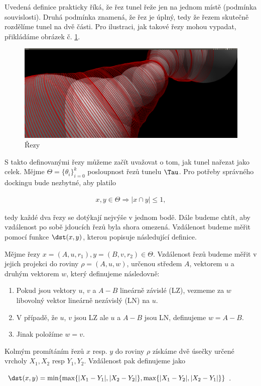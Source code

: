 Uvedená definice prakticky říká, že řez tunel řeže jen na jednom místě (podmínka souvislosti).
Druhá podmínka znamená, že řez je úplný, tedy že řezem skutečně rozdělíme tunel na dvě části.
Pro ilustraci, jak takové řezy mohou vypadat, přikládáme obrázek č. \ref{fig:tunnel_cuts}.
\begin{figure}[ht]
    \centering
    \includegraphics[width=\textwidth]{img/simple_cuts.png}
    \caption{Řezy}
  \centering
  \label{fig:tunnel_cuts}
\end{figure}

S takto definovanými řezy můžeme začít uvažovat o tom, jak tunel nařezat jako celek.
Mějme $ \Theta = \{\theta_i\}_{i=0}^{k}$ posloupnost řezů tunelu $ \Tau $. Pro potřeby správného
dockingu bude nezbytné, aby platilo

\begin{align}
x, y \in \Theta \Rightarrow |x \cap y| \leq 1, \label{cond:not_intersecting}
\end{align}

tedy každé dva řezy se dotýkají nejvýše v jednom bodě. Dále budeme chtít, aby vzdálenost
po sobě jdoucích řezů byla shora omezená. Vzdálenost budeme měřit pomocí funkce
$ \dst(x, y) $, kterou popisuje následující definice.

\begin{defi}
Mějme řezy $ x = (A, u, r_1), y = (B, v, r_2) \in \Theta $. Vzdálenost řezů budeme
měřit v jejich projekci do roviny $ \rho = (A, u, w) $, určenou středem $ A $,
vektorem $ u $ a druhým vektorem $ w $, který definujeme následovně:
    \begin{enumerate}[label={(\arabic*)}]
        \item Pokud jsou vektory $ u $, $ v $ a $ A - B $ lineárně závislé (LZ), vezmeme
            za $ w $ libovolný vektor lineárně nezávislý (LN) na $ u $.
        \item V případě, že $ u $, $ v $ jsou LZ ale $ u $ a $ A - B $ jsou LN,
            definujeme $ w = A - B $.
        \item Jinak položíme $ w = v $.
    \end{enumerate}
Kolmým promítáním řezů $ x $ resp. $ y $ do roviny  $ \rho $ získáme dvě úsečky
určené vrcholy $X_1, X_2 $ resp $Y_1, Y_2 $. Vzdálenost pak definujeme jako
\begin{center}
    $ \dst(x, y) = \min\{ \max\{|X_1 - Y_1|, |X_2 - Y_2|\}, \max\{|X_1 - Y_2|, |X_2 - Y_1|\}\}$.
\end{center}
\end{defi}

